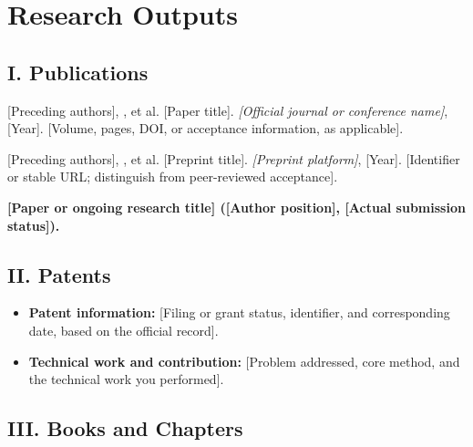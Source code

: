 \documentclass[english]{academic-cv}
\begin{document}
\section{Research Outputs}

\subsection*{I. Publications}

\begin{enumerate}[label={[\arabic*]},leftmargin=2em,labelsep=.55em,itemsep=5pt]
  \item {[Preceding authors]}, , et al.
    [Paper title]. \textit{[Official journal or conference name]}, [Year]. [Volume, pages, DOI, or acceptance information, as applicable].
  \item {[Preceding authors]}, , et al.
    [Preprint title]. \textit{[Preprint platform]}, [Year]. [Identifier or stable URL; distinguish from peer-reviewed acceptance].
  \item \textbf{[Paper or ongoing research title] ([Author position], [Actual submission status]).}\par
    [Research question and method; your own work; results already obtained and evaluation conditions. Expand to two or three lines where useful.]
\end{enumerate}

\subsection*{II. Patents}

\begin{itemize}
  \item \textbf{Patent information:} [Filing or grant status, identifier, and corresponding date, based on the official record].
  \item \textbf{Technical work and contribution:} [Problem addressed, core method, and the technical work you performed].
\end{itemize}

\subsection*{III. Books and Chapters}
\end{document}
